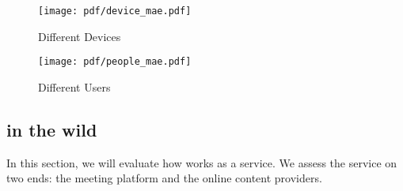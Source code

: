 \begin{figure}[t]
    \centering
    \begin{minipage}{0.5\linewidth}
         \texttt{[image: pdf/device\_mae.pdf]}
        \caption{Different Devices}
        \label{subfig:device}
    \end{minipage}\hfill
    \begin{minipage}{0.49\linewidth}
        \texttt{[image: pdf/people\_mae.pdf]}
        \caption{Different Users}
        \label{subfig:people}
    \end{minipage}\hfill
\end{figure}


\subsection{\sysname in the wild}
In this section, we will evaluate how \sysname works as a service. We assess the service on two ends: the meeting platform and the online content providers. 



